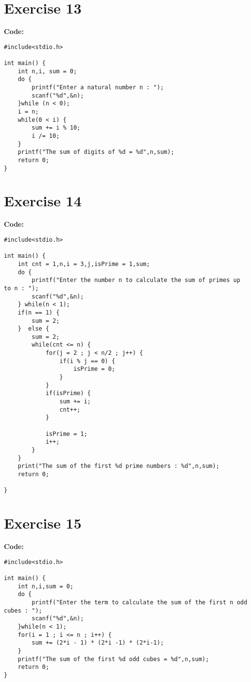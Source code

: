 \documentclass[12pt]{article}
\begin{document}
	\section*{Exercise 13}
	\vspace{0.5cm}
	
	\textbf{Code:}
\begin{lstlisting}
#include<stdio.h>

int main() {
    int n,i, sum = 0;
    do {
        printf("Enter a natural number n : ");
        scanf("%d",&n);
    }while (n < 0);
    i = n;
    while(0 < i) {
        sum += i % 10;
        i /= 10;
    }
    printf("The sum of digits of %d = %d",n,sum);
    return 0;
}
\end{lstlisting}
	\vspace{1cm}
	
	\section*{Exercise 14}
	\vspace{0.5cm}
	
	\textbf{Code:}
\begin{lstlisting}
#include<stdio.h>

int main() {
    int cnt = 1,n,i = 3,j,isPrime = 1,sum;
    do {
        printf("Enter the number n to calculate the sum of primes up to n : ");
        scanf("%d",&n);
    } while(n < 1);
    if(n == 1) {
        sum = 2;
    }  else {
        sum = 2;
        while(cnt <= n) {
            for(j = 2 ; j < n/2 ; j++) {
                if(i % j == 0) {
                    isPrime = 0;
                }
            }
            if(isPrime) {
                sum += i;
                cnt++;
            }

            isPrime = 1;
            i++;
        }
    }
    print("The sum of the first %d prime numbers : %d",n,sum);
    return 0;

}
\end{lstlisting}
	\vspace{1cm}
	
	\section*{Exercise 15}
	\vspace{0.5cm}
	
	\textbf{Code:}
\begin{lstlisting}
#include<stdio.h>

int main() {
    int n,i,sum = 0;
    do {
        printf("Enter the term to calculate the sum of the first n odd cubes : ");
        scanf("%d",&n);
    }while(n < 1);
    for(i = 1 ; i <= n ; i++) {
        sum += (2*i - 1) * (2*i -1) * (2*i-1);
    }
    printf("The sum of the first %d odd cubes = %d",n,sum);
    return 0;
}
\end{lstlisting}
	\vspace{1cm}
\end{document}
